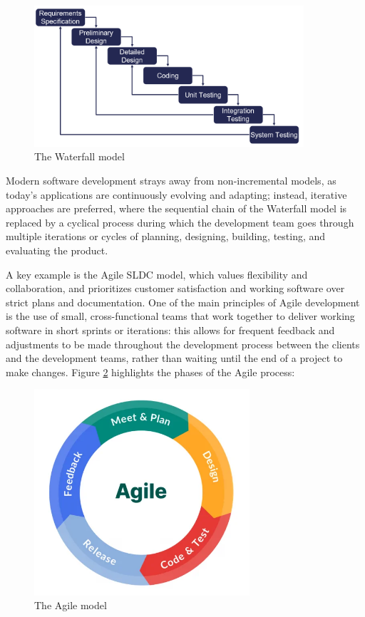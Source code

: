 \begin{figure}[H]
    \centering
    \includegraphics[width=10cm, scale=0.5]{figures/waterfall_model.png}
    \caption{The Waterfall model}
    \label{waterfall_model}
\end{figure}

Modern software development strays away from non-incremental models, as today's applications are continuously evolving and adapting; instead, iterative approaches are preferred, where the sequential chain of the Waterfall model is replaced by a cyclical process during which the development team goes through multiple iterations or cycles of planning, designing, building, testing, and evaluating the product.

A key example is the Agile SLDC model, which values flexibility and collaboration, and prioritizes customer satisfaction and working software over strict plans and documentation. One of the main principles of Agile development is the use of small, cross-functional teams that work together to deliver working software in short sprints or iterations: this allows for frequent feedback and adjustments to be made throughout the development process between the clients and the development teams, rather than waiting until the end of a project to make changes.
Figure \ref{agile_model} highlights the phases of the Agile process:

\begin{figure}[h]
    \centering
    \includegraphics[width=8cm, scale=0.2]{figures/agile_model.jpg}
    \caption{The Agile model}
    \label{agile_model}
\end{figure}

